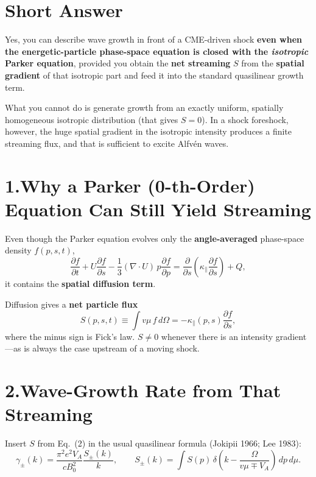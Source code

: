 \section*{Short Answer}

\noindent
Yes, you can describe wave growth in front of a CME-driven shock \textbf{even when the energetic-particle phase-space equation is closed with the \textit{isotropic} Parker equation}, provided you obtain the \textbf{net streaming} $S$ from the \textbf{spatial gradient} of that isotropic part and feed it into the standard quasilinear growth term.

\noindent
What you cannot do is generate growth from an exactly uniform, spatially homogeneous isotropic distribution (that gives $S=0$). In a shock foreshock, however, the huge spatial gradient in the isotropic intensity produces a finite streaming flux, and that is sufficient to excite Alfvén waves.

\section*{1.\quad Why a Parker (0-th-Order) Equation Can Still Yield Streaming}

Even though the Parker equation evolves only the \textbf{angle-averaged} phase-space density $f(p,s,t)$,
\[
\frac{\partial f}{\partial t}
+ U \frac{\partial f}{\partial s}
- \frac{1}{3}(\nabla \cdot U)\, p \frac{\partial f}{\partial p}
= \frac{\partial}{\partial s} \left( \kappa_{\parallel} \frac{\partial f}{\partial s} \right)
+ Q,
\tag{1}
\]
it contains the \textbf{spatial diffusion term}.

\noindent
Diffusion gives a \textbf{net particle flux}
\[
S(p,s,t) \equiv \int v\mu\,f\,d\Omega
= - \kappa_{\parallel}(p,s) \frac{\partial f}{\partial s},
\tag{2}
\]
where the minus sign is Fick’s law. $S \neq 0$ whenever there is an intensity gradient---as is always the case upstream of a moving shock.

\section*{2.\quad Wave-Growth Rate from That Streaming}

Insert $S$ from Eq.~(2) in the usual quasilinear formula (Jokipii 1966; Lee 1983):
\[
\boxed{
\gamma_\pm(k) = \frac{\pi^{2}e^{2}V_A}{cB_0^{2}} \frac{S_\pm(k)}{k}
}, \qquad
S_\pm(k) = \int S(p) \, \delta\left( k - \frac{\Omega}{v\mu \mp V_A} \right) \, dp \, d\mu.
\tag{3}
\]

